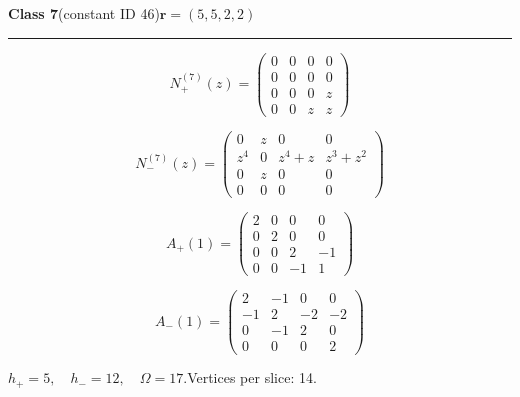 \noindent\begin{minipage}{\linewidth}
\noindent\textbf{Class 7}\quad\small (constant ID 46)\hfill $\symbf{r}=(5,5,2,2)$
\par\smallskip\noindent\textcolor{rulegray}{\rule{\linewidth}{0.3pt}}
\begin{minipage}[c]{0.495\linewidth}\centering\fontsize{9.7}{12}\selectfont
\setlength{\abovedisplayskip}{4pt}\setlength{\belowdisplayskip}{4pt}
\setlength{\abovedisplayshortskip}{4pt}\setlength{\belowdisplayshortskip}{4pt}
\setlength{\arraycolsep}{3pt}\renewcommand{\arraystretch}{1.08}
\[N_{+}^{(7)}(z)=\begin{pmatrix}0 & 0 & 0 & 0\\0 & 0 & 0 & 0\\0 & 0 & 0 & z\\0 & 0 & z & z\end{pmatrix}\]
\end{minipage}%
\begin{minipage}[c]{0.495\linewidth}\centering\fontsize{9.7}{12}\selectfont
\setlength{\abovedisplayskip}{4pt}\setlength{\belowdisplayskip}{4pt}
\setlength{\abovedisplayshortskip}{4pt}\setlength{\belowdisplayshortskip}{4pt}
\setlength{\arraycolsep}{3pt}\renewcommand{\arraystretch}{1.08}
\[N_{-}^{(7)}(z)=\begin{pmatrix}0 & z & 0 & 0\\z^{4} & 0 & z^{4} + z & z^{3} + z^{2}\\0 & z & 0 & 0\\0 & 0 & 0 & 0\end{pmatrix}\]
\end{minipage}%
\par\noindent
\begin{minipage}[c]{0.495\linewidth}\centering\fontsize{9.7}{12}\selectfont
\setlength{\abovedisplayskip}{4pt}\setlength{\belowdisplayskip}{4pt}
\setlength{\abovedisplayshortskip}{4pt}\setlength{\belowdisplayshortskip}{4pt}
\setlength{\arraycolsep}{3pt}\renewcommand{\arraystretch}{1.08}
\[A_{+}(1)=\begin{pmatrix}2 & 0 & 0 & 0\\0 & 2 & 0 & 0\\0 & 0 & 2 & -1\\0 & 0 & -1 & 1\end{pmatrix}\]
\end{minipage}%
\begin{minipage}[c]{0.495\linewidth}\centering\fontsize{9.7}{12}\selectfont
\setlength{\abovedisplayskip}{4pt}\setlength{\belowdisplayskip}{4pt}
\setlength{\abovedisplayshortskip}{4pt}\setlength{\belowdisplayshortskip}{4pt}
\setlength{\arraycolsep}{3pt}\renewcommand{\arraystretch}{1.08}
\[A_{-}(1)=\begin{pmatrix}2 & -1 & 0 & 0\\-1 & 2 & -2 & -2\\0 & -1 & 2 & 0\\0 & 0 & 0 & 2\end{pmatrix}\]
\end{minipage}%
\par\smallskip\noindent\small $h_+=5,\quad h_-=12,\quad \Omega=17.$\quad Vertices per slice: 14.
\end{minipage}\par\vfill
